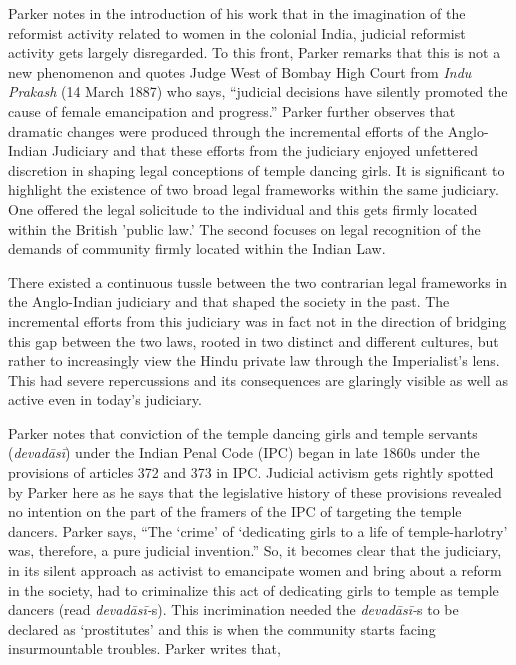 Parker notes in the introduction of his work that in the imagination of the reformist activity related to women in the colonial India, judicial reformist activity gets largely disregarded. To this front, Parker remarks that this is not a new phenomenon and quotes Judge West of Bombay High Court from \textit{Indu Prakash} (14 March 1887) who says, “judicial decisions have silently promoted the cause of female emancipation and progress.” Parker further observes that dramatic changes were produced through the incremental efforts of the Anglo-Indian Judiciary and that these efforts from the judiciary enjoyed unfettered discretion in shaping legal conceptions of temple dancing girls. It is significant to highlight the existence of two broad legal frameworks within the same judiciary. One offered the legal solicitude to the individual and this gets firmly located within the British 'public law.’ The second focuses on legal recognition of the demands of community firmly located within the Indian Law.

There existed a continuous tussle between the two contrarian legal frameworks in the Anglo-Indian judiciary and that shaped the society in the past. The incremental efforts from this judiciary was in fact not in the direction of bridging this gap between the two laws, rooted in two distinct and different cultures, but rather to increasingly view the Hindu private law through the Imperialist’s lens. This had severe repercussions and its consequences are glaringly visible as well as active even in today’s judiciary.

Parker notes that conviction of the temple dancing girls and temple servants (\textit{devadāsī}) under the Indian Penal Code (IPC) began in late 1860s under the provisions of articles 372 and 373 in IPC. Judicial activism gets rightly spotted by Parker here as he says that the legislative history of these provisions revealed no intention on the part of the framers of the IPC of targeting the temple dancers. Parker says, “The `crime' of `dedicating girls to a life of temple-harlotry' was, therefore, a pure judicial invention.” So, it becomes clear that the judiciary, in its silent approach as activist to emancipate women and bring about a reform in the society, had to criminalize this act of dedicating girls to temple as temple dancers (read \textit{devadāsī-}s). This incrimination needed the \textit{devadāsī-}s to be declared as ‘prostitutes’ and this is when the community starts facing insurmountable troubles. Parker writes that,

